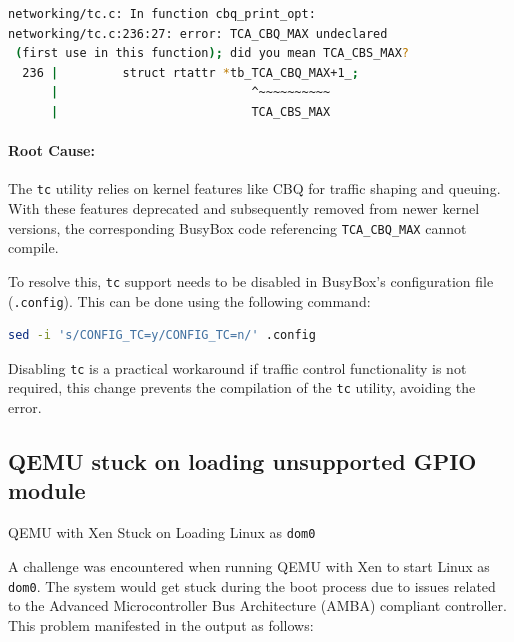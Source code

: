 \documentclass[acmtog]{acmart}
\begin{document}
\begin{lstlisting}[language=bash, caption=Failure on compile BusyBox]
networking/tc.c: In function cbq_print_opt:
networking/tc.c:236:27: error: TCA_CBQ_MAX undeclared
 (first use in this function); did you mean TCA_CBS_MAX?
  236 |         struct rtattr *tb_TCA_CBQ_MAX+1_;
      |                           ^~~~~~~~~~~
      |                           TCA_CBS_MAX
\end{lstlisting}

\paragraph{Root Cause:}The \texttt{tc} utility relies on kernel features like CBQ for traffic shaping and queuing. With these features deprecated and subsequently removed from newer kernel versions, the corresponding BusyBox code referencing \texttt{TCA\_CBQ\_MAX} cannot compile.

To resolve this, \texttt{tc} support needs to be disabled in BusyBox's configuration file (\texttt{.config}). This can be done using the following command:

\begin{lstlisting}[language=bash, caption=Solution to Disable Traffic Control ]
sed -i 's/CONFIG_TC=y/CONFIG_TC=n/' .config
\end{lstlisting}

Disabling \texttt{tc} is a practical workaround if traffic control functionality is not required, this change prevents the compilation of the \texttt{tc} utility, avoiding the error.





\subsection{QEMU stuck on loading unsupported GPIO module}
QEMU with Xen Stuck on Loading Linux as \texttt{dom0}

A challenge was encountered when running QEMU with Xen to start Linux as \texttt{dom0}. The system would get stuck during the boot process due to issues related to the Advanced Microcontroller Bus Architecture (AMBA) compliant controller. This problem manifested in the output as follows:
\end{document}
